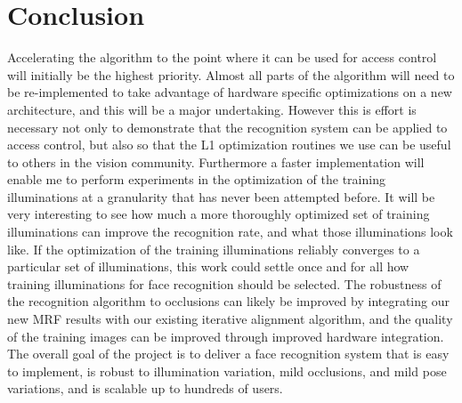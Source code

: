 \section{Conclusion}
Accelerating the algorithm to the point where it can be used for access control
will initially be the highest priority.  Almost all parts of the algorithm will
need to be re-implemented to take advantage of hardware specific optimizations
on a new architecture, and this will be a major undertaking.  However this is
effort is necessary not only to demonstrate that the recognition system can be
applied to access control, but also so that the L1 optimization routines we use
can be useful to others in the vision community.  Furthermore a faster
implementation will enable me to perform experiments in the optimization of the
training illuminations at a granularity that has never been attempted before.
It will be very interesting to see how much a more thoroughly optimized set of
training illuminations can improve the recognition rate, and what those
illuminations look like.  If the optimization of the training illuminations
reliably converges to a particular set of illuminations, this work could settle
once and for all how training illuminations for face recognition should be
selected.  The robustness of the recognition algorithm to occlusions can likely
be improved by integrating our new MRF results with our existing iterative
alignment algorithm, and the quality of the training images can be improved
through improved hardware integration.  The overall goal of the project is to
deliver a face recognition system that is easy to implement, is robust to
illumination variation, mild occlusions, and mild pose variations, and is
scalable up to hundreds of users.
